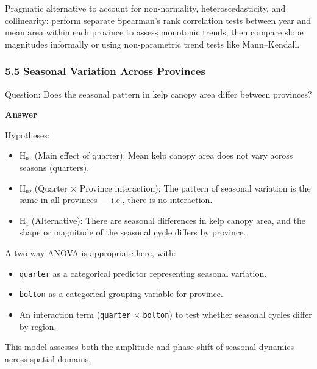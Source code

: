 \documentclass[
  british,
  10pt,
]{article}
\providecommand{\tightlist}{%
  \setlength{\itemsep}{0pt}\setlength{\parskip}{0pt}}
\let\oldtexttt\texttt
\renewcommand{\texttt}[1]{\oldtexttt{\small #1}}
\begin{document}
Pragmatic alternative to account for non-normality, heteroscedasticity,
and collinearity: perform separate Spearman's rank correlation tests
between year and mean area within each province to assess monotonic
trends, then compare slope magnitudes informally or using non-parametric
trend tests like Mann--Kendall.

\subsubsection{5.5 Seasonal Variation Across
Provinces}\label{seasonal-variation-across-provinces}

Question: Does the seasonal pattern in kelp canopy area differ between
provinces?

\textbf{Answer}

Hypotheses:

\begin{itemize}
\tightlist
\item
  H₀₁ (Main effect of quarter): Mean kelp canopy area does not vary
  across seasons (quarters).
\item
  H₀₂ (Quarter × Province interaction): The pattern of seasonal
  variation is the same in all provinces --- i.e., there is no
  interaction.
\item
  H₁ (Alternative): There are seasonal differences in kelp canopy area,
  and the shape or magnitude of the seasonal cycle differs by province.
\end{itemize}

A two-way ANOVA is appropriate here, with:

\begin{itemize}
\tightlist
\item
  \texttt{quarter} as a categorical predictor representing seasonal
  variation.
\item
  \texttt{bolton} as a categorical grouping variable for province.
\item
  An interaction term (\texttt{quarter} × \texttt{bolton}) to test
  whether seasonal cycles differ by region.
\end{itemize}

This model assesses both the amplitude and phase-shift of seasonal
dynamics across spatial domains.
\end{document}
